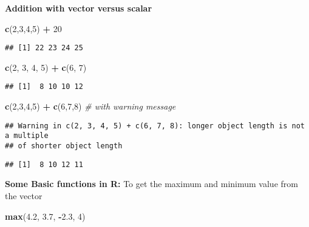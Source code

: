 \documentclass[
]{article}
\newenvironment{Shaded}{\begin{snugshade}}{\end{snugshade}}
\newcommand{\CommentTok}[1]{\textcolor[rgb]{0.56,0.35,0.01}{\textit{#1}}}
\newcommand{\DecValTok}[1]{\textcolor[rgb]{0.00,0.00,0.81}{#1}}
\newcommand{\FloatTok}[1]{\textcolor[rgb]{0.00,0.00,0.81}{#1}}
\newcommand{\FunctionTok}[1]{\textcolor[rgb]{0.13,0.29,0.53}{\textbf{#1}}}
\newcommand{\NormalTok}[1]{#1}
\newcommand{\SpecialCharTok}[1]{\textcolor[rgb]{0.81,0.36,0.00}{\textbf{#1}}}
\begin{document}
\textbf{Addition with vector versus scalar}

\begin{Shaded}
\begin{Highlighting}[]
\FunctionTok{c}\NormalTok{(}\DecValTok{2}\NormalTok{,}\DecValTok{3}\NormalTok{,}\DecValTok{4}\NormalTok{,}\DecValTok{5}\NormalTok{) }\SpecialCharTok{+} \DecValTok{20}
\end{Highlighting}
\end{Shaded}

\begin{verbatim}
## [1] 22 23 24 25
\end{verbatim}

\begin{Shaded}
\begin{Highlighting}[]
\FunctionTok{c}\NormalTok{(}\DecValTok{2}\NormalTok{, }\DecValTok{3}\NormalTok{, }\DecValTok{4}\NormalTok{, }\DecValTok{5}\NormalTok{) }\SpecialCharTok{+} \FunctionTok{c}\NormalTok{(}\DecValTok{6}\NormalTok{, }\DecValTok{7}\NormalTok{)}
\end{Highlighting}
\end{Shaded}

\begin{verbatim}
## [1]  8 10 10 12
\end{verbatim}

\begin{Shaded}
\begin{Highlighting}[]
\FunctionTok{c}\NormalTok{(}\DecValTok{2}\NormalTok{,}\DecValTok{3}\NormalTok{,}\DecValTok{4}\NormalTok{,}\DecValTok{5}\NormalTok{) }\SpecialCharTok{+} \FunctionTok{c}\NormalTok{(}\DecValTok{6}\NormalTok{,}\DecValTok{7}\NormalTok{,}\DecValTok{8}\NormalTok{) }\CommentTok{\# with warning message}
\end{Highlighting}
\end{Shaded}

\begin{verbatim}
## Warning in c(2, 3, 4, 5) + c(6, 7, 8): longer object length is not a multiple
## of shorter object length
\end{verbatim}

\begin{verbatim}
## [1]  8 10 12 11
\end{verbatim}

\newpage

\textbf{Some Basic functions in R:} To get the maximum and minimum value
from the vector

\begin{Shaded}
\begin{Highlighting}[]
\FunctionTok{max}\NormalTok{(}\FloatTok{4.2}\NormalTok{, }\FloatTok{3.7}\NormalTok{, }\SpecialCharTok{{-}}\FloatTok{2.3}\NormalTok{, }\DecValTok{4}\NormalTok{)}
\end{Highlighting}
\end{Shaded}
\end{document}
